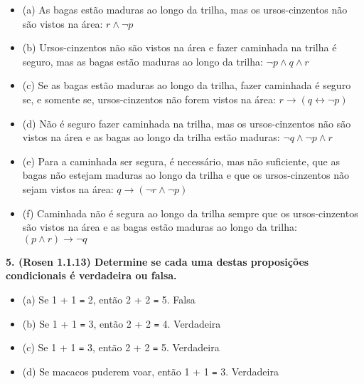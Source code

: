 \documentclass{article}
\begin{document}
\begin{itemize}[label={}]
    \item (a) As bagas estão maduras ao longo da trilha, mas os ursos-cinzentos não são vistos na área: \> $r \wedge \neg p$
    
    \item (b) Ursos-cinzentos não são vistos na área e fazer caminhada na trilha é seguro, mas as bagas estão maduras ao longo da trilha: \> $\neg p \wedge q \wedge r$
    
    \item (c) Se as bagas estão maduras ao longo da trilha, fazer caminhada é seguro se, e somente se, ursos-cinzentos não forem vistos na área: \> $r \rightarrow (q \leftrightarrow \neg p)$
    
    \item (d) Não é seguro fazer caminhada na trilha, mas os ursos-cinzentos não são vistos na área e as bagas ao longo da trilha estão maduras: \> $\neg q \wedge \neg p \wedge r $
    
    \item (e) Para a caminhada ser segura, é necessário, mas não suficiente, que as bagas não estejam maduras ao longo da trilha e que os ursos-cinzentos não sejam vistos na área: \> $q \rightarrow (\neg r \wedge \neg p)$

    \item (f) Caminhada não é segura ao longo da trilha sempre que os ursos-cinzentos são vistos na área e as bagas estão maduras ao longo da trilha: \> $(p \wedge r)  \rightarrow \neg q $
    
\end{itemize}

\vspace{1cm}

\textbf{5. (Rosen 1.1.13) Determine se cada uma destas proposições condicionais é verdadeira ou falsa.}

\begin{itemize}[label={}]
    \item (a) Se 1 + 1 \texttt{=} 2, então 2 + 2 \texttt{=} 5. \> Falsa \\
    \item (b) Se 1 + 1 \texttt{=} 3, então 2 + 2 \texttt{=} 4. \> Verdadeira \\
    \item (c) Se 1 + 1 \texttt{=} 3, então 2 + 2 \texttt{=} 5. \> Verdadeira \\
    \item (d) Se macacos puderem voar, então 1 + 1 \texttt{=} 3. \> Verdadeira \\
\end{itemize}
\end{document}
